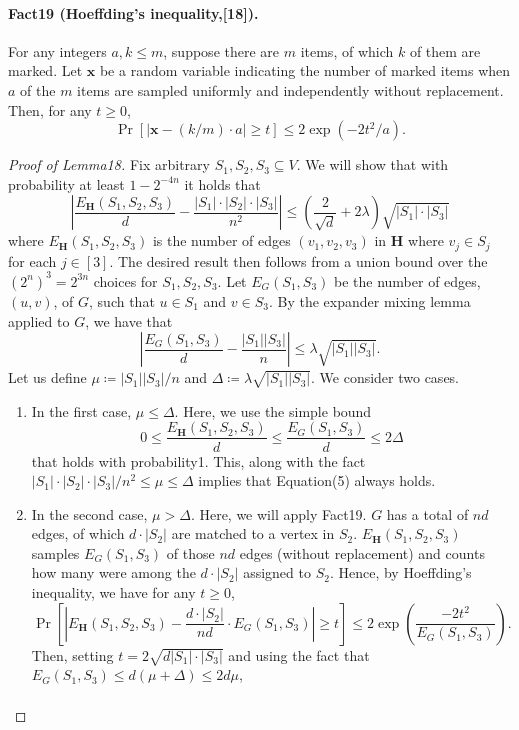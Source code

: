 \paragraph{Fact19 (Hoeffding's inequality,[18]).} For any integers $a,k\leq m$, suppose there are $m$ items, of which $k$ of them are marked. Let $\mathbf x$ be a random variable indicating the number of marked items when $a$ of the $m$ items are sampled uniformly and independently without replacement. Then, for any $t\geq0$,
\[\Pr[|\mathbf x-(k/m)\cdot a|\geq t]\leq2\exp(-2t^2/a).\]
\begin{proof}[Proof of Lemma18]
Fix arbitrary $S_1,S_2,S_3\subseteq V$. We will show that with probability at least $1-2^{-4n}$ it holds that
\[\left|\frac{E_{\mathbf H}(S_1,S_2,S_3)}d-\frac{|S_1|\cdot|S_2|\cdot|S_3|}{n^2}\right|\leq\left(\frac2{\sqrt d}+2\lambda\right)\sqrt{|S_1|\cdot|S_3|}\tag{5}\]
where $E_{\mathbf H}(S_1,S_2,S_3)$ is the number of edges $(v_1,v_2,v_3)$ in $\mathbf H$ where $v_j\in S_j$ for each $j\in[3]$. The desired result then follows from a union bound over the $(2^n)^3=2^{3n}$ choices for $S_1,S_2,S_3$.
Let $E_G(S_1,S_3)$ be the number of edges, $(u,v)$, of $G$, such that $u\in S_1$ and $v\in S_3$. By the expander mixing lemma applied to $G$, we have that
\[\left|\frac{E_G(S_1,S_3)}d-\frac{|S_1||S_3|}n\right|\leq\lambda\sqrt{|S_1||S_3|}.\]
Let us define $\mu\coloneqq|S_1||S_3|/n$ and $\Delta\coloneqq\lambda\sqrt{|S_1||S_3|}$. We consider two cases.
\begin{enumerate}
\item In the first case, $\mu\leq\Delta$. Here, we use the simple bound
\[0\leq\frac{E_{\mathbf H}(S_1,S_2,S_3)}d\leq\frac{E_G(S_1,S_3)}d\leq2\Delta\]
that holds with probability1. This, along with the fact $|S_1|\cdot|S_2|\cdot|S_3|/n^2\leq\mu\leq\Delta$ implies that Equation(5) always holds.
\item In the second case, $\mu>\Delta$. Here, we will apply Fact19. $G$ has a total of $nd$ edges, of which $d\cdot|S_2|$ are matched to a vertex in $S_2$. $E_{\mathbf H}(S_1,S_2,S_3)$ samples $E_G(S_1,S_3)$ of those $nd$ edges (without replacement) and counts how many were among the $d\cdot|S_2|$ assigned to $S_2$. Hence, by Hoeffding's inequality, we have for any $t\geq0$,
\[\Pr\left[\left|E_{\mathbf H}(S_1,S_2,S_3)-\frac{d\cdot|S_2|}{nd}\cdot E_G(S_1,S_3)\right|\geq t\right]\leq2\exp\left(\frac{-2t^2}{E_G(S_1,S_3)}\right).\]
Then, setting $t=2\sqrt{d|S_1|\cdot|S_3|}$ and using the fact that $E_G(S_1,S_3)\leq d(\mu+\Delta)\leq2d\mu$,
\begin{multline*}

\end{multline*}
\end{enumerate}
\end{proof}
